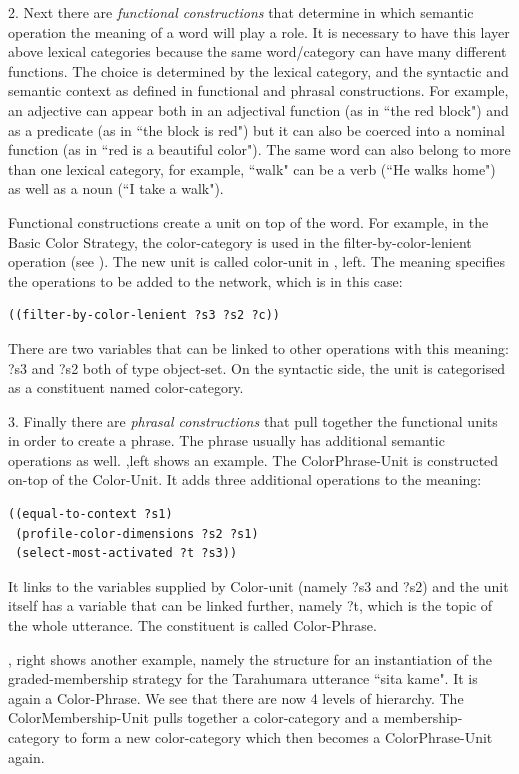 2. Next there are {\itshape functional constructions} that determine in which semantic operation the meaning of a word 
will play a role. It is necessary to have this layer above lexical categories because the same word/category can have many 
different functions. The choice is determined by the lexical category, and the syntactic and semantic context as 
defined in functional and phrasal constructions. For example, an adjective can appear both in an adjectival 
function (as in ``the red block") and as a predicate (as in ``the block is red") but it can also be coerced 
into a nominal function (as in ``red is a beautiful color"). The same word can also belong to more than one 
lexical category, for example, ``walk" can be a verb (``He walks home") as well as a noun (``I take a walk"). 

Functional constructions create a unit on top of the word. For example, in the Basic Color Strategy, 
the color-category is used in the filter-by-color-lenient operation (see ). 
The new unit is called color-unit in , left. 
The meaning specifies the operations to be added to the network, which is in this case: 
\begin{verbatim}
((filter-by-color-lenient ?s3 ?s2 ?c))
\end{verbatim}
There are two variables that can be linked to other operations with this meaning: ?s3 and ?s2 both of type object-set. 
On the syntactic side, the unit is categorised as a constituent named color-category. 

3. Finally there are {\itshape phrasal constructions} that pull together the functional units in order to create a phrase. 
The phrase usually has additional semantic operations as well. ,left shows an example. 
The ColorPhrase-Unit is constructed on-top of the Color-Unit. It adds three additional operations to the meaning: 
\begin{verbatim}
((equal-to-context ?s1)
 (profile-color-dimensions ?s2 ?s1)
 (select-most-activated ?t ?s3))
\end{verbatim}
It links to the variables supplied by Color-unit (namely ?s3 and ?s2) and the unit itself has a variable that can 
be linked further, namely ?t, which is the topic of the whole utterance. 
The constituent is called Color-Phrase. 

, right shows another example, namely the structure for an instantiation of the 
graded-membership strategy for the Tarahumara utterance ``sita kame". It is again a Color-Phrase.
We see that there are now 4 levels of hierarchy. The ColorMembership-Unit pulls together a color-category and 
a membership-category to form a new color-category which then becomes a ColorPhrase-Unit again.\\

